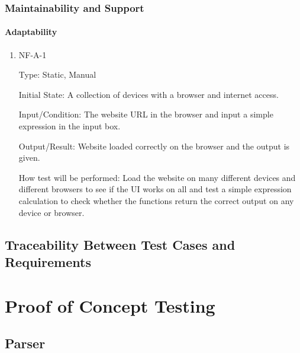 \documentclass[12pt, titlepage]{article}
\begin{document}
\subsubsection{Maintainability and Support }
		
\paragraph{Adaptability}

\begin{enumerate}

\item{NF-A-1}

Type: Static, Manual
					
Initial State: A collection of devices with a browser and internet access. 
					
Input/Condition: The website URL in the browser and input a simple expression in the input box.
					
Output/Result: Website loaded correctly on the browser and the output is given.
					
How test will be performed: Load the website on many different devices and different browsers to see if the UI works on all and test a simple expression calculation to check whether the functions return the correct output on any device or browser. 
\end{enumerate}
\subsection{Traceability Between Test Cases and Requirements}
              
\section{Proof of Concept Testing}
\subsection{Parser}
\end{document}
